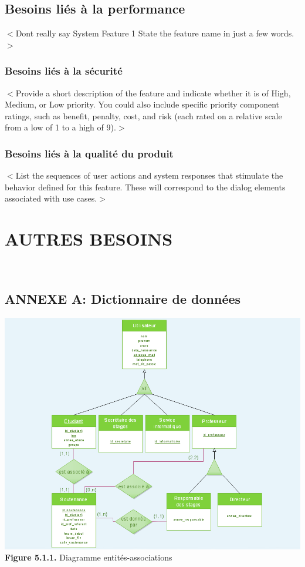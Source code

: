 \documentclass{scrreprt}
\begin{document}
\section{Besoins liés à la performance}
$<$Dont really say System Feature 1 State the feature name in just a few 
words.$>$

\subsection{Besoins liés à la sécurité}
$<$Provide a short description of the feature and indicate whether it is of 
High, Medium, or Low priority. You could also include specific priority 
component ratings, such as benefit, penalty, cost, and risk (each rated on a 
relative scale from a low of 1 to a high of 9).$>$

\subsection{Besoins liés à la qualité du produit }
$<$List the sequences of user actions and system responses that stimulate the 
behavior defined for this feature. These will correspond to the dialog elements 
associated with use cases.$>$





\chapter{AUTRES BESOINS}



\
\section{ANNEXE A: Dictionnaire de données}

\begin{center}
	\includegraphics[scale=0.45]{image/diagentiassoc.png}
	\vspace {0.5cm}
	\textbf{Figure 5.1.1.} Diagramme entités-associations
\end{center}
\end{document}
